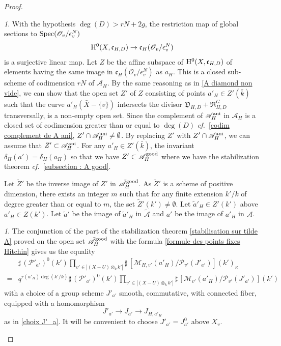\documentclass[12pt,english]{smfart}
\numberwithin{equation}{subsection}
\theoremstyle{remark}
\newtheorem{numero}[equation]{}
\newcommand\calA{{\mathscr A}}
\newcommand\calP{{\mathscr P}}
\newcommand\calM{{\mathscr M}}
\newcommand\calO{{\mathscr O}}
\newcommand\frakc{{\mathfrak c}}
\newcommand\rmH{{\rm H}}
\newcommand\Spec{{\rm Spec}}
\newcommand\cf{{\it cf.\ }}
\newcommand\ani{{\rm ani}}
\newcommand\resultant{\mathfrak R}
\newcommand\discrim{\mathfrak D}
\begin{document}
\begin{proof}
\begin{numero}
With the hypothesis $\deg(D) > rN+2g$, the restriction map of
global sections to $\Spec(\calO_v/ \epsilon_v^N)$
$$\rmH^0(X,\frakc_{H,D}) \rightarrow \frakc_H(\calO_v/ \epsilon_v^N)$$
is a surjective linear map. Let $Z$ be the affine subspace of
$\rmH^0(X,\frakc_{H,D})$ of elements having the same image in
$\frakc_H(\calO_v/ \epsilon_v^N)$ as $a_H$. This is a closed sub-scheme
of codimension $rN$ of $\calA_H$. By the same reasoning
as in \ref{A diamond non vide}, we can show that the open set $Z'$ of
$Z$ consisting of points $a'_H\in Z'(\bar k)$ such that the curve $a'_H(\bar
X-\{v\})$ intersects the divisor $\discrim_{H,D}+\resultant_{H,D}^G$
transversally, is a non-empty open set. Since the complement of
$\calA_H^\ani$ in $\calA_H$ is a closed set of codimension greater
than or equal to $\deg(D)$ \cf \ref{codim complement de A ani}, $Z'\cap
\calA_H^\ani\not= \emptyset$. By replacing $Z'$ with $Z'\cap
\calA_H^\ani$, we can assume that $Z'\subset \calA_H^\ani$. For any
$a'_H\in Z'(\bar k)$, the invariant $\delta_H(a')=\delta_H(a_H)$ so that we
have $Z'\subset \calA_H^{\rm good}$ where we have the stabilization
theorem \cf \ref{subsection : A good}.

Let $\tilde Z'$ be the inverse image of $Z'$ in $\tilde\calA_H^{\rm
good}$. As $\tilde Z'$ is a scheme of positive dimension, there exists
an integer $m$ such that for any finite extension $k'/ k$ of degree greater than or
equal to $m$, the set $\tilde Z'(k')\not= \emptyset$. Let $\tilde a'_H
\in Z'(k')$ above $a'_H\in Z(k')$. Let $\tilde a'$ be the image of $\tilde
a'_H$ in $\tilde\calA$ and $a'$ be the image of $a'_H$ in $\calA$.
\end{numero}

\begin{numero}
The conjunction of the part of the stabilization theorem \ref{stabilisation sur tilde
A} proved on the open set $\tilde\calA_H^{\rm good}$ with the
formula \ref{formule des points fixes Hitchin} gives us the equality
\begin{eqnarray*}
&{\sharp\,}(\calP'_{a'})^0(k') \prod_{v'\in |(X-U)\otimes_k k'|} {\sharp\,}
[\calM_{H,v'}(a'_H)/\calP_{v'}(J'_{a'})](k')_\kappa
\\
=&q^{r(a'_H)\deg(k'/ k)}{\sharp\,}
(\calP'_{a'})^0(k') \prod_{v'\in |(X-U)\otimes_k k'|}
{\sharp\,} [\calM_{v'}(a'_H)/\calP_{v'}(J'_{a'})](k')
\end{eqnarray*}
with a choice of a group scheme $J'_{a'}$ smooth, commutative, with connected
fiber, equipped with a homomorphism
$$J'_{a'}\rightarrow J_{a'}\rightarrow J_{H,a'_H}$$
as in \ref{choix J'_a}. It will be convenient to choose $J'_{a'}=J_{a'}^0$
above $X_v$.
\end{numero}


\end{proof}
\end{document}
